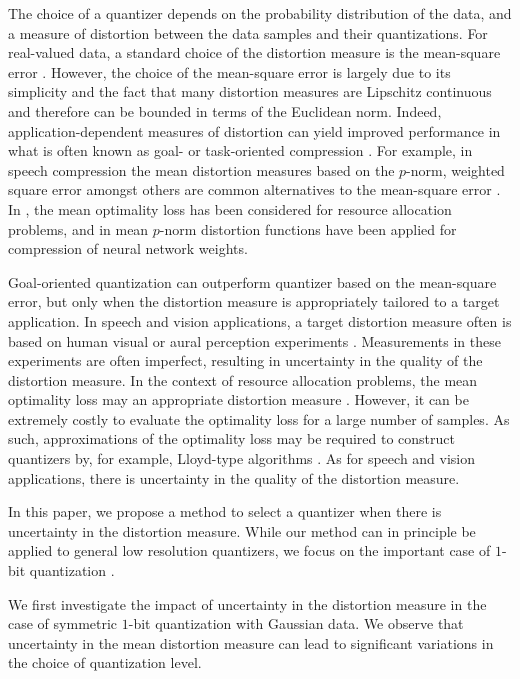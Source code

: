 \documentclass[conference]{IEEEtran}
\begin{document}
The choice of a quantizer depends on the probability distribution of the data, and a measure of distortion between the data samples and their quantizations. For real-valued data, a standard choice of the distortion measure is the mean-square error \cite{Gersho2012vector}. However, the choice of the mean-square error is largely due to its simplicity and the fact that many distortion measures are Lipschitz continuous and therefore can be bounded in terms of the Euclidean norm. Indeed, application-dependent measures of distortion can yield improved performance in what is often known as goal- or task-oriented compression \cite{Gunduz2022beyond}. For example, in speech compression the mean distortion measures based on the $p$-norm, weighted square error amongst others are common alternatives to the mean-square error \cite{Linde1980algorithm}. In \cite{Zou2022goal}, the mean optimality loss has been considered for resource allocation problems, and in \cite{Nahshan2021loss} mean $p$-norm distortion functions have been applied for compression of neural network weights. 

Goal-oriented quantization can outperform quantizer based on the mean-square error, but only when the distortion measure is appropriately tailored to a target application. In speech and vision applications, a target distortion measure often is based on human visual or aural perception experiments \cite{Jayant1993signal,Eckert1998perceptual}. Measurements in these experiments are often imperfect, resulting in uncertainty in the quality of the distortion measure. In the context of resource allocation problems, the mean optimality loss may an appropriate distortion measure \cite{Zou2022goal}. However, it can be extremely costly to evaluate the optimality loss for a large number of samples. As such, approximations of the optimality loss may be required to construct quantizers by, for example, Lloyd-type algorithms \cite{Linde1980algorithm}. As for speech and vision applications, there is uncertainty in the quality of the distortion measure.

In this paper, we propose a method to select a quantizer when there is uncertainty in the distortion measure. While our method can in principle be applied to general low resolution quantizers, we focus on the important case of $1$-bit quantization \cite{Magnani2005optimal}.

We first investigate the impact of uncertainty in the distortion measure in the case of symmetric $1$-bit quantization with Gaussian data. %
We observe that uncertainty in the mean distortion measure can lead to significant variations in the choice of quantization level. 
\end{document}
